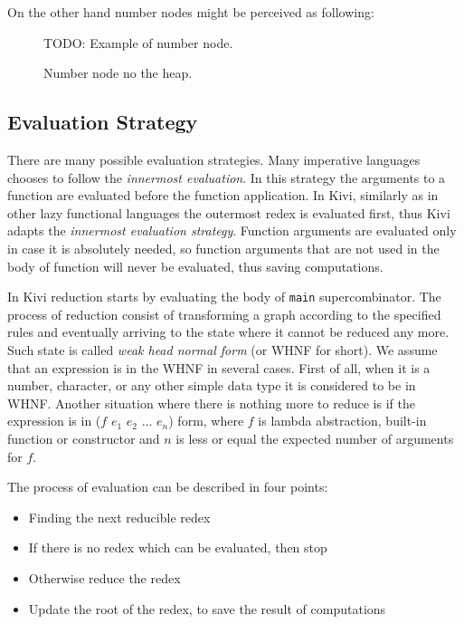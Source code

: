 \documentclass[12pt,a4paper]{report}
\begin{document}
On the other hand number nodes might be perceived as following:

\begin{figure}[h!]
  \centering

  TODO: Example of number node.

  \caption{Number node no the heap.}
  \label{fig:num_node}
\end{figure}

\subsection{Evaluation Strategy}
There are many possible evaluation strategies. Many imperative languages
chooses to follow the \textit{innermost evaluation}. In this strategy the
arguments to a function are evaluated before the function application. In Kivi,
similarly as in other lazy functional languages the outermost redex is
evaluated first, thus Kivi adapts the \textit{innermost evaluation strategy}.
Function arguments are evaluated only in case it is absolutely needed, so
function arguments that are not used in the body of function will never be
evaluated, thus saving computations.

In Kivi reduction starts by evaluating the body of \texttt{main}
supercombinator. The process of reduction consist of transforming a graph
according to the specified rules and eventually arriving to the state where it
cannot be reduced any more. Such state is called \textit{weak head normal form}
(or WHNF for short). We assume that an expression is in the WHNF in several
cases. First of all, when it is a number, character, or any other simple data
type it is considered to be in WHNF. Another situation where there is nothing
more to reduce is if the expression is in ($f$ $e_1$ $e_2$ $\ldots$ $e_n$)
form, where $f$ is lambda abstraction, built-in function or constructor and $n$
is less or equal the expected number of arguments for $f$.

The process of evaluation can be described in four points:

\begin{itemize}
  \item Finding the next reducible redex
  \item If there is no redex which can be evaluated, then stop
  \item Otherwise reduce the redex
  \item Update the root of the redex, to save the result of computations
\end{itemize}
\end{document}
